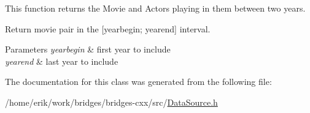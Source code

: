 This function returns the Movie and Actors playing in them between two years. 

Return movie pair in the \mbox{[}yearbegin; yearend\mbox{]} interval.


\begin{DoxyParams}{Parameters}
{\em yearbegin} & first year to include \\
\hline
{\em yearend} & last year to include \\
\hline
\end{DoxyParams}


The documentation for this class was generated from the following file\+:\begin{DoxyCompactItemize}
\item 
/home/erik/work/bridges/bridges-\/cxx/src/\hyperlink{_data_source_8h}{Data\+Source.\+h}\end{DoxyCompactItemize}
